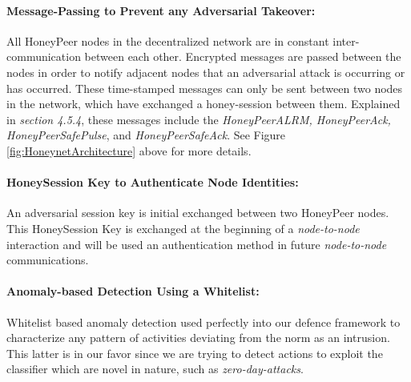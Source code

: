 \documentclass[grad,lot,lof,11pt,oneside,onehalfspace]{RUthesis}
\begin{document}
\paragraph{Message-Passing to Prevent any Adversarial Takeover: }
All HoneyPeer nodes in the decentralized network are in constant inter-communication between each other. Encrypted messages are passed between the nodes in order to notify adjacent nodes that an adversarial attack is occurring or has occurred. These time-stamped messages can only be sent between two nodes in the network, which have exchanged a honey-session between them. Explained in \textit{section 4.5.4}, these messages include the \textit{HoneyPeerALRM, HoneyPeerAck, HoneyPeerSafePulse}, and \textit{HoneyPeerSafeAck}. See Figure \ref{fig:HoneynetArchitecture} above for more details. 
\paragraph{HoneySession Key to Authenticate Node Identities:}
An adversarial session key is initial exchanged between two HoneyPeer nodes. This HoneySession Key is exchanged at the beginning of a \textit{node-to-node} interaction and will be used an authentication method in future \textit{node-to-node} communications.
\paragraph{Anomaly-based Detection Using a Whitelist:}
Whitelist based anomaly detection used perfectly into our defence framework to characterize any pattern of activities deviating from the norm as an intrusion. This latter is in our favor since we are trying to detect actions to exploit the classifier which are novel in nature, such as \textit{zero-day-attacks}.
\end{document}
